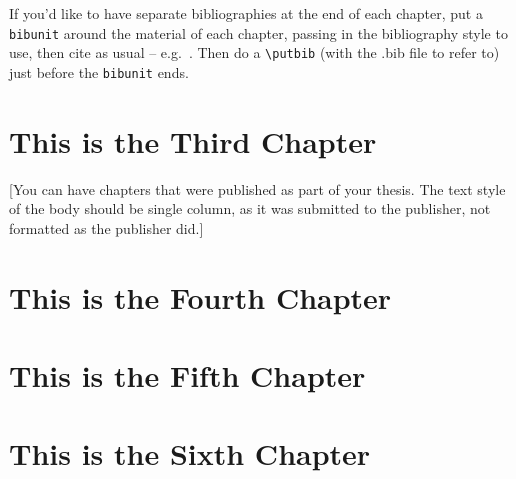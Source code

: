 \documentclass[12pt]{caltech_thesis}
\begin{document}
\begin{bibunit}  
If you'd like to have separate bibliographies at the end of each chapter, put a \verb|bibunit| around the material of each chapter, passing in the bibliography style to use, then cite as usual -- e.g.~\citep{GMP81,Ful83}. Then do a \verb|\putbib| (with the .bib file to refer to) just before the \verb|bibunit| ends. 

\renewcommand{\bibsection}{\section*{\refname}}
\putbib[example]  %
\end{bibunit}

\chapter{This is the Third Chapter}




[You can have chapters that were published as part of your thesis. The text style of the body should be single column, as it was submitted to the publisher, not formatted as the publisher did.]

\chapter{This is the Fourth Chapter}
\chapter{This is the Fifth Chapter}
\chapter{This is the Sixth Chapter}
\end{document}
